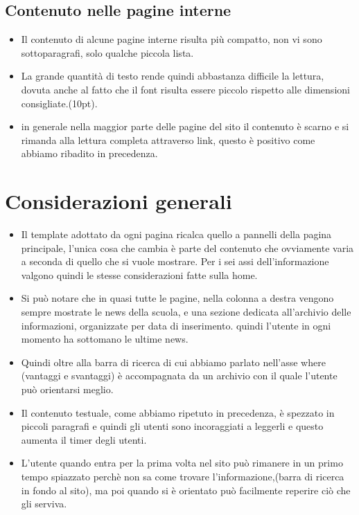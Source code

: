 \documentclass[12pt]{article}
\begin{document}
\subsection{Contenuto nelle pagine interne}
\begin{itemize}

	 \item Il contenuto di alcune pagine interne risulta pi\`u compatto, non vi sono sottoparagrafi, solo qualche piccola lista.

	 \item La grande quantit\`a di testo rende quindi abbastanza difficile la lettura, dovuta anche al fatto che il font risulta essere piccolo rispetto alle dimensioni consigliate.(10pt).

	\item in generale nella maggior parte delle pagine del sito il contenuto \`e scarno e si rimanda alla lettura completa attraverso link, questo \`e positivo come abbiamo ribadito in precedenza.

\end{itemize}

\section{Considerazioni generali}
\begin{itemize}
	\item Il template adottato da ogni pagina ricalca quello a pannelli della pagina principale, l'unica cosa che cambia \`e parte del contenuto che ovviamente varia a seconda di quello che si vuole mostrare. Per i sei assi dell'informazione valgono quindi le stesse considerazioni fatte sulla home.

	\item Si pu\`o notare che in quasi tutte le pagine,  nella colonna a destra vengono sempre mostrate le news della scuola, e una sezione dedicata all'archivio delle informazioni, organizzate per data di inserimento.
	quindi l'utente in ogni momento ha sottomano le ultime news.

	\item Quindi oltre alla barra di ricerca di cui abbiamo parlato nell'asse where (vantaggi e svantaggi) \`e accompagnata da un archivio con il quale l'utente pu\`o orientarsi meglio.

	\item Il contenuto testuale, come abbiamo ripetuto in precedenza, \`e spezzato in piccoli paragrafi e quindi gli utenti sono incoraggiati a leggerli e questo aumenta il timer degli utenti.

	\item L'utente quando entra per la prima volta nel sito pu\`o rimanere in un primo tempo spiazzato perch\`e non sa come trovare l'informazione,(barra di ricerca in fondo al sito), ma poi quando si \`e orientato
	pu\`o facilmente reperire ci\`o che gli serviva.

\end{itemize}
\end{document}
